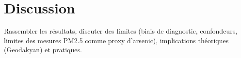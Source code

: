 \chapter{Discussion}
\label{chap:discussion}
Rassembler les résultats, discuter des limites (biais de diagnostic, confondeurs, limites des mesures PM2.5 comme proxy d'arsenic), implications théoriques (Geodakyan) et pratiques.